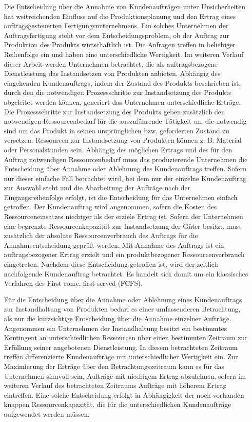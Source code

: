 Die Entscheidung über die Annahme von Kundenaufträgen unter Unsicherheiten hat weitreichenden Einfluss auf die Produktionsplanung und den Ertrag eines auftragsgesteuerten Fertigungsunternehmens. Ein solches Unternehmen der Auftragsfertigung steht vor dem Entscheidungsproblem, ob der Auftrag zur Produktion des Produkts wirtschaftlich ist. Die Anfragen treffen in beliebiger Reihenfolge ein und haben eine unterschiedliche Wertigkeit. Im weiteren Verlauf dieser Arbeit werden Unternehmen betrachtet, die als auftragsbezogene Dienstleistung das Instandsetzen von Produkten anbieten. Abhängig des eingehenden Kundenauftrags, indem der Zustand des Produkts beschrieben ist, durch den die notwendigen Prozessschritte zur Instandsetzung des Produkts abgeleitet werden können, generiert das Unternehmen unterschiedliche Erträge. Die Prozessschritte zur Instandsetzung des Produkts geben zusätzlich den notwendigen Ressourcenbedarf für die auszuführende Tätigkeit an, die notwendig sind um das Produkt in seinen ursprünglichen bzw. geforderten Zustand zu versetzen. Ressourcen zur Instandsetzung von Produkten können z. B. Material oder Personalstunden sein. Abhängig des möglichen Ertrags und des für den Auftrag notwendigen Ressourcenbedarf muss das produzierende Unternehmen die Entscheidung über Annahme oder Ablehnung des Kundenauftrags treffen. Sofern nur dieser einfache Fall betrachtet wird, bei dem nur der einzelne Kundenauftrag zur Auswahl steht und die Abarbeitung der Aufträge nach der Eingangsreihenfolge erfolgt, ist die Entscheidung für das Unternehmen einfach getroffen. Der Kundenauftrag wird angenommen, sofern die Kosten des Ressourceneinsatzes niedriger als der erziele Ertrag ist.
Sofern der Unternehmen eine begrenzte Ressourcenkapazität zur Instandsetzung der Güter besitzt, muss zusätzlich der absolute Ressourcenverbrauch des Auftrags für die Annahmeentscheidung geprüft werden. Mit Annahme des Auftrags ist ein auftragsbezogener Ertrag erzielt und ein produktbezogener Ressourcenverbrauch eingetreten. Nachdem diese Entscheidung getroffen ist, wird der zeitlich nachfolgende Kundenauftrag betrachtet. Es handelt sich damit um ein klassisches Verfahren des \glqq First-come, first-served (FCFS){\grqq}.

Für die Entscheidung über die Annahme oder Ablehnung eines Kundenauftrags zur Instandhaltung von Produkten bedarf es einer umfassenderen Betrachtung, als nur die kurzsichtige Entscheidung über die Annahme einzelner Aufträge. Angenommen ein Unternehmen der Instandhaltung besitzt ein bestimmtes Kontingent an unterschiedlichen Ressourcen über einen bestimmten Zeitraum zur Erfüllung seiner angebotenen Dienstleistung. In diesem betrachteten Zeitraum treffen differenzierte Kundenaufträge mit unterschiedlicher Wertigkeit ein. Zur Maximierung der Erträge über den Betrachtungszeitraum kann es für das Unternehmen sinnvoll sein, Aufträge mit niedrigem Ertrag abzulehnen, sofern im weiteren Verlauf des betrachteten Zeitraums Aufträge mit höherem Ertrag eintreffen. Eine solche Entscheidung erfolgt in Abhängigkeit der noch vorhanden knappen Ressourcenkapazität, die für die unterschiedlichen Kundenaufträge aufgewendet werden müssen.

